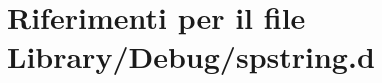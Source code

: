 \hypertarget{_debug_2spstring_8d}{
\section{Riferimenti per il file Library/Debug/spstring.d}
\label{_debug_2spstring_8d}
}
